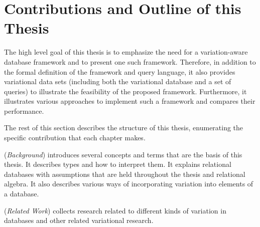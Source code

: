 \section{Contributions and Outline of this Thesis}
\label{sec:contribution}


The high level goal of this thesis is to emphasize the need for a variation-aware database
framework and to present one such framework. Therefore, in addition to the formal 
definition of the framework and query language, it also provides variational data sets 
(including both the variational database and a set of queries) to illustrate the feasibility
of the proposed framework. Furthermore, it illustrates various approaches to implement
such a framework and compares their performance.

The rest of this section describes the structure of this thesis, enumerating the specific 
contribution that each chapter makes. 

 (\emph{Background}) introduces several concepts and terms that are the 
basis of this thesis. It describes types and how to interpret them. It explains relational
databases with assumptions that are held throughout the thesis and relational algebra. 
It also describes various ways of incorporating variation
into elements of a database. 







 (\emph{Related Work}) collects research related to different kinds of variation 
in databases and other related variational research. 

